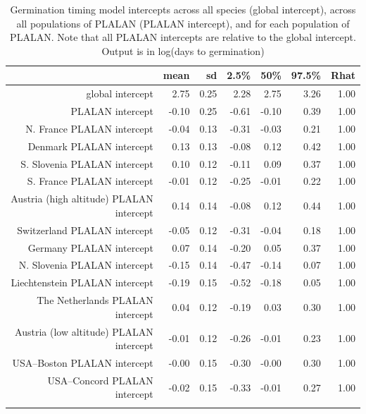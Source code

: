 \documentclass[12pt]{article}\usepackage[]{graphicx}\usepackage[]{color}
\begin{document}
\begin{longtable}{rrrrrrr}
\caption{Germination timing model intercepts across all species (global intercept), across all populations of PLALAN (PLALAN intercept), and for each population of PLALAN. Note that all PLALAN intercepts are relative to the global intercept.  Output is in log(days to germination)} \\ 
  & mean & sd & 2.5\% & 50\% & 97.5\% & Rhat \\ 
  \hline
global intercept & 2.75 & 0.25 & 2.28 & 2.75 & 3.26 & 1.00 \\ 
  PLALAN intercept & -0.10 & 0.25 & -0.61 & -0.10 & 0.39 & 1.00 \\ 
  N. France PLALAN intercept & -0.04 & 0.13 & -0.31 & -0.03 & 0.21 & 1.00 \\ 
  Denmark PLALAN intercept & 0.13 & 0.13 & -0.08 & 0.12 & 0.42 & 1.00 \\ 
  S. Slovenia PLALAN intercept & 0.10 & 0.12 & -0.11 & 0.09 & 0.37 & 1.00 \\ 
  S. France PLALAN intercept & -0.01 & 0.12 & -0.25 & -0.01 & 0.22 & 1.00 \\ 
  Austria (high altitude) PLALAN intercept & 0.14 & 0.14 & -0.08 & 0.12 & 0.44 & 1.00 \\ 
  Switzerland PLALAN intercept & -0.05 & 0.12 & -0.31 & -0.04 & 0.18 & 1.00 \\ 
  Germany PLALAN intercept & 0.07 & 0.14 & -0.20 & 0.05 & 0.37 & 1.00 \\ 
  N. Slovenia PLALAN intercept & -0.15 & 0.14 & -0.47 & -0.14 & 0.07 & 1.00 \\ 
  Liechtenstein PLALAN intercept & -0.19 & 0.15 & -0.52 & -0.18 & 0.05 & 1.00 \\ 
  The Netherlands PLALAN intercept & 0.04 & 0.12 & -0.19 & 0.03 & 0.30 & 1.00 \\ 
  Austria (low altitude) PLALAN intercept & -0.01 & 0.12 & -0.26 & -0.01 & 0.23 & 1.00 \\ 
  USA--Boston PLALAN intercept & -0.00 & 0.15 & -0.30 & -0.00 & 0.30 & 1.00 \\ 
  USA--Concord PLALAN intercept & -0.02 & 0.15 & -0.33 & -0.01 & 0.27 & 1.00 \\ 
  \hline
\label{tab:mod_time_intercept}
\end{longtable}
\end{document}
